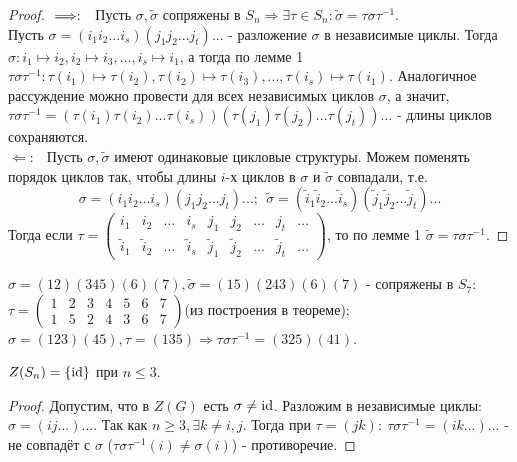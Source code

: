 \begin{proof}
    $ \\ \Longrightarrow: \ \ $ Пусть $\sigma, \tilde{\sigma}$ сопряжены в $S_n \Longrightarrow \exists \tau \in S_n: \tilde{\sigma} = \tau \sigma \tau^{-1}$.\\
    Пусть $\sigma = (i_1i_2...i_s)(j_1j_2...j_t)...$ - разложение $\sigma$ в независимые циклы. Тогда $\sigma: i_1 \mapsto i_2, i_2 \mapsto i_3,..., i_s \mapsto i_1$, а тогда по лемме 1 $\tau\sigma\tau^{-1}: \tau(i_1) \mapsto \tau(i_2), \tau(i_2) \mapsto \tau(i_3),..., \tau(i_s) \mapsto \tau(i_1)$. Аналогичное рассуждение можно провести для всех независимых циклов $\sigma$, а значит, $\tau\sigma\tau^{-1} = (\tau(i_1)\tau(i_2)...\tau(i_s))(\tau(j_1)\tau(j_2)...\tau(j_t))...$ - длины циклов сохраняются.\\
    $\Longleftarrow: \ \ $ Пусть $\sigma, \tilde{\sigma}$ имеют одинаковые цикловые структуры. Можем поменять порядок циклов так, чтобы длины $i$-х циклов в $\sigma$ и $\tilde{\sigma}$ совпадали, т.е.
    \[\sigma = (i_1i_2...i_s)(j_1j_2...j_t)...; \ \ \tilde{\sigma} = (\tilde{i}_1\tilde{i}_2...\tilde{i}_s)(\tilde{j}_1\tilde{j}_2...\tilde{j}_t)...\]
    Тогда если $\tau = \begin{pmatrix} i_1&i_2&...&i_s&j_1&j_2&...&j_t&...\\ \tilde{i}_1&\tilde{i}_2&...&\tilde{i}_s&\tilde{j}_1&\tilde{j}_2&...&\tilde{j}_t&... \end{pmatrix}$, то по лемме 1 $\tilde{\sigma} = \tau \sigma \tau^{-1}$.  
\end{proof}
\begin{examples}
    $\sigma = (12)(345)(6)(7), \tilde{\sigma} = (15)(243)(6)(7)$ - сопряжены в $S_7$:\\$\tau = \begin{pmatrix} 1&2&3&4&5&6&7\\1&5&2&4&3&6&7  \end{pmatrix}$(из построения в теореме);\\
    $\sigma = (123)(45), \tau = (135) \Longrightarrow \tau\sigma\tau^{-1} = (325)(41)$.
\end{examples}
\begin{consequense}
    $Z(S_n) = \{\textup{id}\}$ при $n \leqslant 3$.
\end{consequense}
\begin{proof}
    Допустим, что в $Z(G)$ есть $\sigma \neq \textup{id}$. Разложим в независимые циклы: $\sigma = (ij...)...$. Так как $n \geqslant 3, \exists k \neq i, j$. Тогда при $\tau = (jk): \ \tau\sigma\tau^{-1} = (ik...)...$ - не совпадёт с $\sigma$ ($\tau\sigma\tau^{-1}(i) \neq \sigma(i)$) - противоречие.  
\end{proof}
